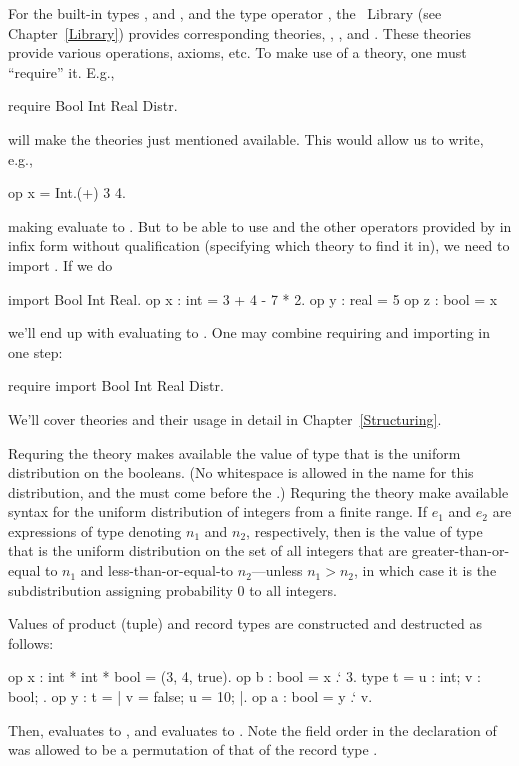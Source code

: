 For the built-in types ,  and , and the type
operator , the \EasyCrypt\ Library (see
Chapter~\ref{Library}) provides corresponding theories, ,
,  and . These theories provide various
operations, axioms, etc.  To make use of a theory, one must
``require'' it.  E.g.,
\begin{easycrypt}{}{}
require Bool Int Real Distr.
\end{easycrypt}
will make the theories just mentioned available. This
would allow us to write, e.g.,
\begin{easycrypt}{}{}
op x = Int.(+) 3 4.
\end{easycrypt}
making  evaluate to . But to be able to use \ec{+}
and the other operators provided by 
in infix form without qualification (specifying which theory to
find it in), we need to import . If we do
\begin{easycrypt}{}{}
import Bool Int Real.
op x : int = 3 + 4 - 7 * 2.
op y : real = 5%
op z : bool = x%
\end{easycrypt}
we'll end up with  evaluating to .
One may combine requiring and importing in one step:
\begin{easycrypt}{}{}
require import Bool Int Real Distr.
\end{easycrypt}
We'll cover theories and their usage in detail in
Chapter~\ref{Structuring}.

Requring the theory  makes available the value 
of type  that is the uniform distribution on
the booleans. (No whitespace is allowed in the name for this distribution,
and the  must come before the .)
Requring the theory  make available syntax for the uniform
distribution of integers from a finite range. If $e_1$ and $e_2$
are expressions of type  denoting $n_1$ and $n_2$, respectively,
then \ec{[$e_1$..$e_2$]} is the value of type 
that is the uniform distribution on the set of
all integers that are greater-than-or-equal to $n_1$ and less-than-or-equal-to
$n_2$---unless $n_1>n_2$, in which case it is the subdistribution assigning
probability $0$ to all integers.

Values of product (tuple) and record types are constructed and
destructed as follows:
\begin{easycrypt}{}{}
op x : int * int * bool = (3, 4, true).
op b : bool = x .` 3.
type t = { u : int; v : bool; }.
op y : t = {| v = false; u = 10; |}.
op a : bool = y .` v.
\end{easycrypt}
Then,  evaluates to , and  evaluates to .
Note the field order in the declaration of  was allowed to be
a permutation of that of the record type .

